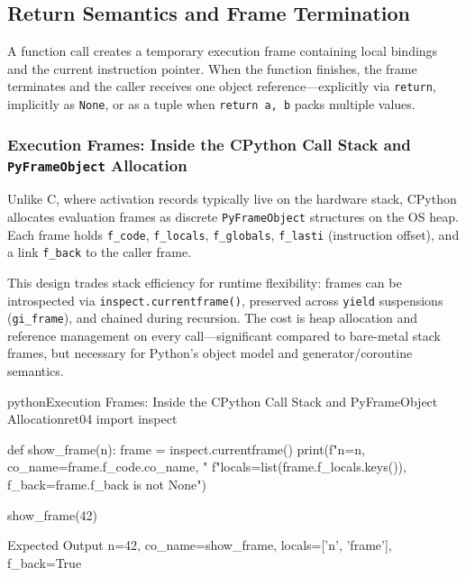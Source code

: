 \subsection{Return Semantics and Frame Termination}

A function call creates a temporary execution frame containing local bindings and the current instruction pointer. When the function finishes, the frame terminates and the caller receives one object reference---explicitly via \texttt{return}, implicitly as \texttt{None}, or as a tuple when \texttt{return a, b} packs multiple values.

\subsubsection{Execution Frames: Inside the CPython Call Stack and \texttt{PyFrameObject} Allocation}

Unlike C, where activation records typically live on the hardware stack, CPython allocates evaluation frames as discrete \texttt{PyFrameObject} structures on the OS heap. Each frame holds \texttt{f\_code}, \texttt{f\_locals}, \texttt{f\_globals}, \texttt{f\_lasti} (instruction offset), and a link \texttt{f\_back} to the caller frame.

This design trades stack efficiency for runtime flexibility: frames can be introspected via \texttt{inspect.currentframe()}, preserved across \texttt{yield} suspensions (\texttt{gi\_frame}), and chained during recursion. The cost is heap allocation and reference management on every call---significant compared to bare-metal stack frames, but necessary for Python's object model and generator/coroutine semantics.

\begin{codebox}[]{python}{Execution Frames: Inside the CPython Call Stack and PyFrameObject Allocation}{ret04}
import inspect

def show_frame(n):
    frame = inspect.currentframe()
    print(f"n={n}, co_name={frame.f_code.co_name}, "
          f"locals={list(frame.f_locals.keys())}, f_back={frame.f_back is not None}")

show_frame(42)
\end{codebox}


\begin{iobox}{Expected Output}
n=42, co\_name=show\_frame, locals=['n', 'frame'], f\_back=True \\
\end{iobox}




